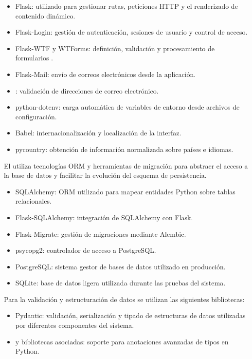 \begin{itemize}
\tightlist
	\item Flask:  utilizado para gestionar rutas, peticiones HTTP y el renderizado de contenido dinámico.
	\item Flask-Login: gestión de autenticación, sesiones de usuario y control de acceso.
	\item Flask-WTF y WTForms: definición, validación y procesamiento de formularios .
	\item Flask-Mail: envío de correos electrónicos desde la aplicación.
	\item {}: validación de direcciones de correo electrónico.
	\item python-dotenv: carga automática de variables de entorno desde archivos de configuración.
	\item Babel: internacionalización y localización de la interfaz.
	\item pycountry: obtención de información normalizada sobre países e idiomas.
\end{itemize}

El  utiliza tecnologías ORM y herramientas de migración para abstraer el acceso a la base de datos y facilitar la evolución del esquema de persistencia.

\begin{itemize}
\tightlist
	\item SQLAlchemy: ORM utilizado para mapear entidades Python sobre tablas relacionales.
	\item Flask-SQLAlchemy: integración de SQLAlchemy con Flask.
	\item Flask-Migrate: gestión de migraciones mediante Alembic.
	\item psycopg2: controlador de acceso a PostgreSQL.
	\item PostgreSQL: sistema gestor de bases de datos utilizado en producción.
	\item SQLite: base de datos ligera utilizada durante las pruebas del sistema.
\end{itemize}

Para la validación y estructuración de datos se utilizan las siguientes bibliotecas:

\begin{itemize}
\tightlist
	\item Pydantic: validación, serialización y tipado de estructuras de datos utilizadas por diferentes componentes del sistema.
	\item {} y bibliotecas asociadas: soporte para anotaciones avanzadas de tipos en Python.
\end{itemize}

